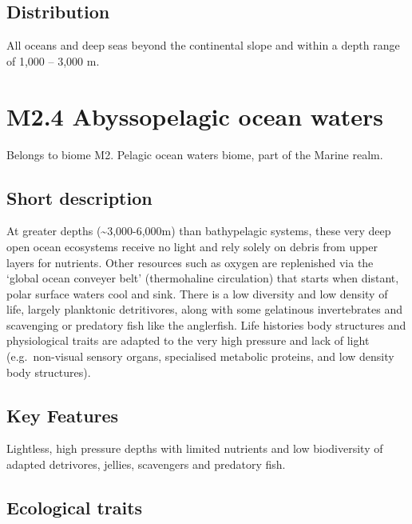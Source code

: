 \documentclass[
  letterpaper,
  DIV=11,
  numbers=noendperiod]{scrartcl}
\begin{document}
\subsection{Distribution}\label{distribution-37}

All oceans and deep seas beyond the continental slope and within a depth
range of 1,000 -- 3,000 m.

\section{M2.4 Abyssopelagic ocean
waters}\label{m2.4-abyssopelagic-ocean-waters}

Belongs to biome M2. Pelagic ocean waters biome, part of the Marine
realm.

\subsection{Short description}\label{short-description-38}

At greater depths (\textasciitilde3,000-6,000m) than bathypelagic
systems, these very deep open ocean ecosystems receive no light and rely
solely on debris from upper layers for nutrients. Other resources such
as oxygen are replenished via the `global ocean conveyer belt'
(thermohaline circulation) that starts when distant, polar surface
waters cool and sink. There is a low diversity and low density of life,
largely planktonic detritivores, along with some gelatinous
invertebrates and scavenging or predatory fish like the anglerfish. Life
histories body structures and physiological traits are adapted to the
very high pressure and lack of light (e.g.~non-visual sensory organs,
specialised metabolic proteins, and low density body structures).

\subsection{Key Features}\label{key-features-38}

Lightless, high pressure depths with limited nutrients and low
biodiversity of adapted detrivores, jellies, scavengers and predatory
fish.

\subsection{Ecological traits}\label{ecological-traits-38}
\end{document}
